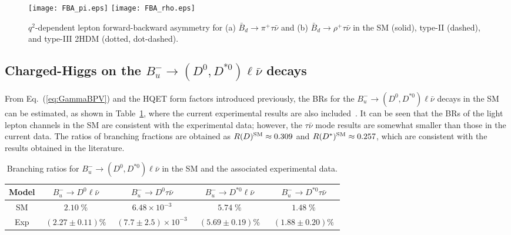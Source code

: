 \documentclass[prd,preprint,superscriptaddress,amsmath,amssymb]{revtex4}
\begin{document}
 \begin{figure}[phtb]
\texttt{[image: FBA\_pi.eps]}
\texttt{[image: FBA\_rho.eps]}
\caption{ $q^2$-dependent lepton forward-backward asymmetry for (a) $\bar B_d \to \pi^+ \tau \bar\nu$ and (b) $\bar B_d \to \rho^+ \tau \bar \nu$ in the SM (solid), type-II (dashed), and type-III 2HDM (dotted, dot-dashed).    }
\label{fig:FBA_pirho}
\end{figure} 

    
   \subsection{ Charged-Higgs on the $B^-_u \to (D^0, D^{*0})\ell \bar \nu$ decays}
   
   From Eq.~(\ref{eq:GammaBPV}) and the HQET form factors introduced previously, the BRs for the $B^-_u \to (D^0, D^{*0}) \ell \bar \nu$ decays in the SM can be estimated, as shown in Table~\ref{tab:BD_Dv}, where  the current experimental results are also included~\cite{PDG}. It can be seen that  the BRs of the light lepton channels in the SM are consistent with the experimental data; however, the  $\tau\bar\nu$ mode results are somewhat smaller than  those in the current data. The  ratios of branching fractions are obtained as $R(D)^{\rm SM}\approx 0.309$ and $R(D^*)^{\rm SM}\approx 0.257$, which are consistent with the results obtained in the literature.  
 
   \begin{table}[htbp]
 \caption{ Branching ratios for $B^-_u \to (D^0, D^{*0}) \ell \bar\nu$ in the SM and the associated experimental data. }
  \label{tab:BD_Dv}
  \begin{tabular}{ c|cccc}\hline \hline
Model & ~~$ B^-_u \to D^0 \ell \bar \nu$~~ & ~~$ B^-_u \to D^0 \tau \bar \nu$~~ &  ~~$B^-_u \to D^{*0} \ell \bar \nu$~~ & ~~$B^-_u \to D^{*0} \tau \bar \nu$~~ \\  \hline
SM  & $2.10\; \%$  & $6.48\times 10^{-3}$ & $5.74\; \%$ &  $1.48\; \%$\\  \hline
 Exp \cite{PDG} & $(2.27\pm 0.11)\%$ & $(7.7\pm 2.5)\times 10^{-3}$ & $(5.69\pm 0.19)\%$ & $(1.88 \pm 0.20)\%$\\  \hline \hline

  \end{tabular}
 \end{table}
  
\end{document}
